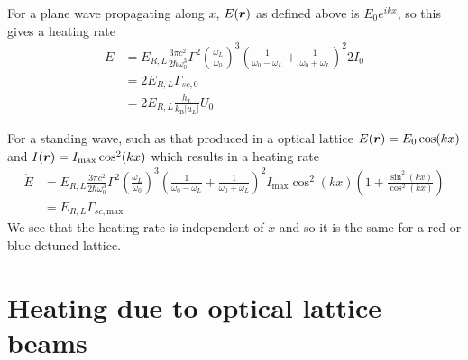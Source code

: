 For a plane wave propagating along $x$, $E(\bm{r})$ as defined above is
$E_{0}e^{ikx}$, so this gives a heating rate 
\begin{equation}
\begin{split}
\dot{E} &  =  
  E_{R,L}
   \frac{3\pi c^{2}}{2\hbar\omega_{0}^{3} }  
   \Gamma^{2}
  \left( \frac{ \omega_{L} }{ \omega_{0} } \right)^{3}
   \left(  \frac{1}{\omega_{0}-\omega_{L}} 
    + \frac{1}{\omega_{0} + \omega_{L} } \right)^{2}
   2  I_{0}  \\
  & = 
   2 E_{R,L}  \Gamma_{sc,0}  \\ 
  & = 
   2 E_{R,L} \frac{ h_{L} }{k_{\text{B}}|u_{L}|} U_{0} 
\end{split} 
\label{eq:heat-dipole}
\end{equation}

For a standing wave, such as that produced in a optical lattice $E(\bm{r}) =
E_{0} \cos(kx) $ and $I(\bm{r})=I_{\text{max}}\cos^{2}(kx)$ which results in
a heating rate 
\begin{equation}
\begin{split}
\dot{E} &  =  
  E_{R,L}
   \frac{3\pi c^{2}}{2\hbar\omega_{0}^{3} }  
   \Gamma^{2}
  \left( \frac{ \omega_{L} }{ \omega_{0} } \right)^{3}
   \left(  \frac{1}{\omega_{0}-\omega_{L}} 
    + \frac{1}{\omega_{0} + \omega_{L} } \right)^{2}
     I_{\max} \cos^{2}(kx) 
   \left( 1 + \frac{\sin^{2}(kx)}{\cos^{2}(kx)} \right) \\
  & = 
   E_{R,L}  \Gamma_{sc,\text{max}}
\end{split}
\end{equation}
We see that the heating rate is independent of $x$ and so it is the same for
a red or blue detuned lattice. 
  
 
 

\section{Heating due to optical lattice beams} 

